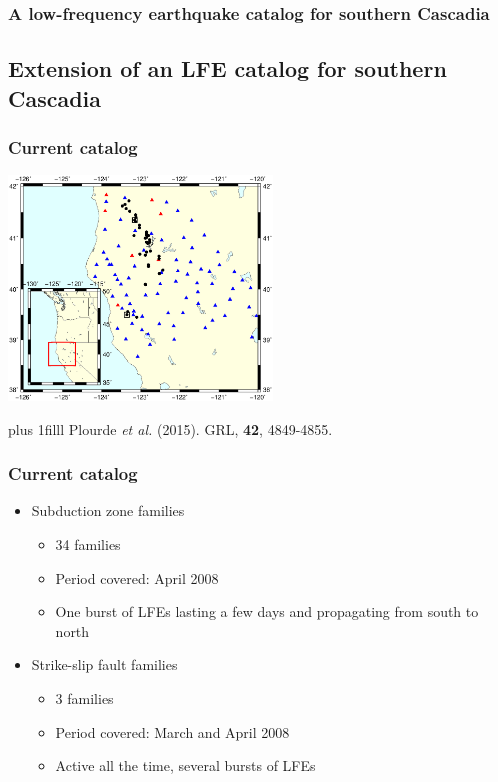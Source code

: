 \documentclass{beamer}
\newcommand{\btVFill}{\vskip0pt plus 1filll}
\begin{document}
	\begin{frame}
		\frametitle{A low-frequency earthquake catalog for southern Cascadia}
	\end{frame}


	\subsection{Extension of an LFE catalog for southern Cascadia}
	
	\begin{frame}
		\frametitle{Current catalog}
		\begin{center}
			\includegraphics[trim={1cm 3cm 1cm 10cm}, clip, width=7cm]{catalog_SC/families_map.eps}
		\end{center}
		\btVFill
		\tiny{Plourde \textit{et al.}  (2015). GRL, \textbf{42}, 4849-4855.}
	\end{frame}

	\begin{frame}
		\frametitle{Current catalog}
		\begin{itemize}
			\item Subduction zone families
			\begin{itemize}
				\item 34 families
				\item Period covered: April 2008
				\item One burst of LFEs lasting a few days and propagating from south to north
			\end{itemize}
			\item Strike-slip fault families
			\begin{itemize}
				\item 3 families
				\item Period covered: March and April 2008
				\item Active all the time, several bursts of LFEs
			\end{itemize}
		\end{itemize}
	\end{frame}
\end{document}
